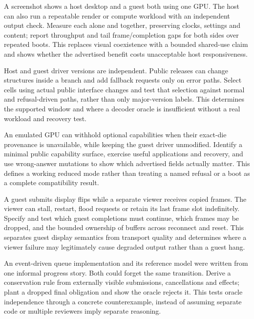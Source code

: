 {A screenshot shows a host desktop and a guest both using one GPU. The host can also run a
repeatable render or compute workload with an independent output check.}
{Measure each alone and together, preserving clocks, settings and content; report throughput and
tail frame/completion gaps for both sides over repeated boots.}
{This replaces visual coexistence with a bounded shared-use claim and shows whether the advertised
benefit costs unacceptable host responsiveness.}
\label{q:coexist}

{Host and guest driver versions are independent. Public releases can change structures inside a
branch and add fallback requests only on error paths.}
{Select cells using actual public interface changes and test that selection against normal and
refusal-driven paths, rather than only major-version labels.}
{This determines the supported window and where a decoder oracle is insufficient without a real
workload and recovery test.}
\label{q:versions}

{An emulated GPU can withhold optional capabilities when their exact-die provenance is
unavailable, while keeping the guest driver unmodified.}
{Identify a minimal public capability surface, exercise useful applications and recovery, and use
wrong-answer mutations to show which advertised fields actually matter.}
{This defines a working reduced mode rather than treating a named refusal or a boot as a complete
compatibility result.}
\label{q:fallback}

{A guest submits display flips while a separate viewer receives copied frames. The viewer can
stall, restart, flood requests or retain its last frame slot indefinitely.}
{Specify and test which guest completions must continue, which frames may be dropped, and the
bounded ownership of buffers across reconnect and reset.}
{This separates guest display semantics from transport quality and determines where a viewer
failure may legitimately cause degraded output rather than a guest hang.}
\label{q:display}

{An event-driven queue implementation and its reference model were written from one informal
progress story. Both could forget the same transition.}
{Derive a conservation rule from externally visible submissions, cancellations and effects; plant
a dropped final obligation and show the oracle rejects it.}
{This tests oracle independence through a concrete counterexample, instead of assuming separate
code or multiple reviewers imply separate reasoning.}
\label{q:oracle}

